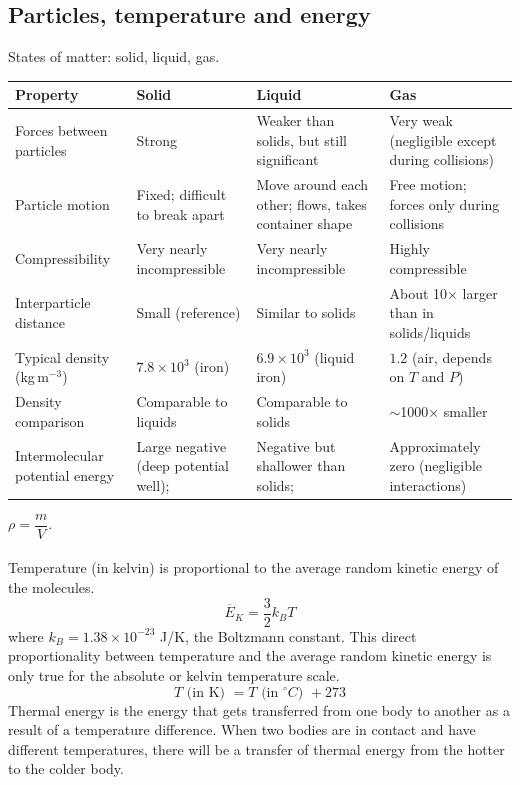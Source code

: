 \documentclass[a4paper,12pt]{article}
\begin{document}
\subsection{Particles, temperature and energy}
States of matter: solid, liquid, gas.
\begin{center}
\begin{tabularx}{\textwidth}{@{}|Y |Y |Y| Y|@{}}
\toprule
\textbf{Property} & \textbf{Solid} & \textbf{Liquid} & \textbf{Gas} \\
\midrule
Forces between particles & Strong & Weaker than solids, but still significant & Very weak (negligible except during collisions) \\\hline
Particle motion & Fixed; difficult to break apart & Move around each other; flows, takes container shape & Free motion; forces only during collisions \\\hline
Compressibility & Very nearly incompressible & Very nearly incompressible & Highly compressible \\\hline
Interparticle distance & Small (reference) & Similar to solids & About 10× larger than in solids/liquids \\\hline
Typical density (kg\,m$^{-3}$) & $7.8\times10^3$ (iron) & $6.9\times10^3$ (liquid iron) & $1.2$ (air, depends on $T$ and $P$) \\\hline
Density comparison & Comparable to liquids & Comparable to solids & $\sim$1000× smaller \\\hline
Intermolecular potential energy & Large negative (deep potential well); & Negative but shallower than solids; & Approximately zero (negligible interactions) \\
\bottomrule
\end{tabularx}
\end{center}
$\rho=\dfrac{m}{V}$.\\\\
Temperature (in kelvin) is proportional to the average random kinetic energy of the molecules.
\[\overline{E}_K=\dfrac{3}{2}k_BT\]
where $k_B=1.38\times 10^{-23}$ J/K, the Boltzmann constant. This direct proportionality between temperature and the average random kinetic energy is only true for the absolute or kelvin temperature scale.\\
\[T\text{ (in K) }=T\text{ (in $^\circ C$) }+273\]
Thermal energy is the energy that gets transferred from one body to another as a result of a temperature difference.
When two bodies are in contact and have different temperatures, there will be a transfer of thermal energy from the hotter to the colder body.
\end{document}
